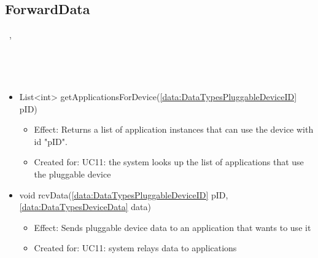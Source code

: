   \subsection{ForwardData}\label{int:OnlineServiceOnlineServiceApplicationManagerApplicationManagementLogicForwardData}
    \begin{description}
      \item[Provided by:] \iconcomponent{}~, \iconcomponent{}~
      \item[Required by:] \iconcomponent{}~
      \item[Operations:] ~
    \begin{itemize}[noitemsep,nolistsep,leftmargin=-.25cm]
      \item \textsf{List\textless{}int\textgreater{} getApplicationsForDevice(\ref{data:DataTypesPluggableDeviceID} pID)}
        \begin{itemize}[noitemsep,nolistsep]
           \item Effect: Returns a list of application instances that can use the device with id "pID". \\
\item Created for: UC11: the system looks up the list of applications that use the pluggable device
        \end{itemize}
      \item \textsf{void rcvData(\ref{data:DataTypesPluggableDeviceID} pID, \ref{data:DataTypesDeviceData} data)}
        \begin{itemize}[noitemsep,nolistsep]
           \item Effect: Sends pluggable device data to an application that wants to use it \\
\item Created for: UC11: system relays data to applications
        \end{itemize}
    \end{itemize}
    \end{description}

